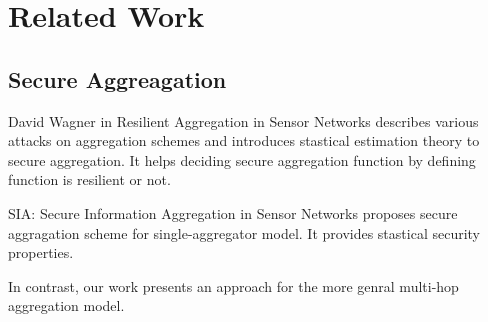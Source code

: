 \chapter{Related Work}

\section{Secure Aggreagation}

David Wagner in Resilient Aggregation in Sensor Networks describes various attacks on aggregation schemes and introduces stastical estimation theory to secure aggregation. It helps deciding secure aggregation function by defining function is resilient or not.

SIA: Secure Information Aggregation in Sensor Networks proposes secure aggragation scheme for single-aggregator model. It provides stastical security properties. 

In contrast, our work presents an approach for the more genral multi-hop aggregation model.
